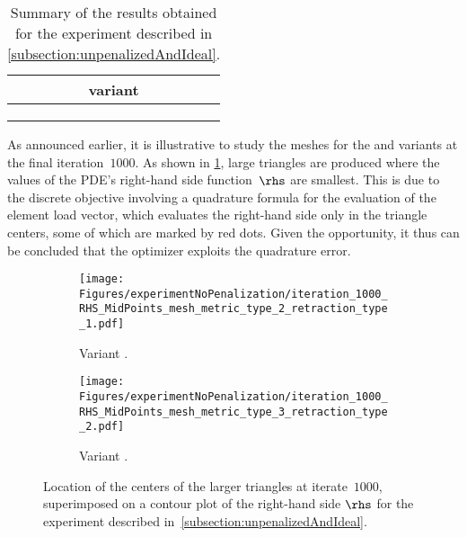 \begin{table}[htp]
	\begin{center}
	\begin{tabular}{c}
		\toprule
		variant
		\\
		\midrule
		\EucEuc
		\\
		\ElasEuc
		\\
		\CompComp
		\\
		\bottomrule
	\end{tabular}%
	\end{center}
	\caption{Summary of the results obtained for the experiment described in \cref{subsection:unpenalizedAndIdeal}.}
	\label{table:experimentNoPenalization}
\end{table}

As announced earlier, it is illustrative to study the meshes for the \ElasEuc and \CompComp variants at the final iteration~$1000$.
As shown in \cref{fig:rhsMidpointsFinalMeshes}, large triangles are produced where the values of the PDE's right-hand side function~$\rhs$ are smallest.
This is due to the discrete objective involving a quadrature formula for the evaluation of the element load vector, which evaluates the right-hand side only in the triangle centers, some of which are marked by red dots.
Given the opportunity, it thus can be concluded that the optimizer exploits the quadrature error.

\begin{figure}[htp]
	\begin{center}
		\begin{subfigure}{0.45\textwidth}
			\centering
			\texttt{[image: Figures/experimentNoPenalization/iteration\_1000\_RHS\_MidPoints\_mesh\_metric\_type\_2\_retraction\_type\_1.pdf]}
			\caption{Variant \ElasEuc.}
		\end{subfigure}
		\hfill
		\begin{subfigure}{0.45\textwidth}
			\centering
			\texttt{[image: Figures/experimentNoPenalization/iteration\_1000\_RHS\_MidPoints\_mesh\_metric\_type\_3\_retraction\_type\_2.pdf]}
			\caption{Variant \CompComp.}
		\end{subfigure}
		\caption{Location of the centers of the larger triangles at iterate~$1000$, superimposed on a contour plot of the right-hand side $\rhs$ for the experiment described in~\cref{subsection:unpenalizedAndIdeal}.}
		\label{fig:rhsMidpointsFinalMeshes}
	\end{center}
\end{figure}

